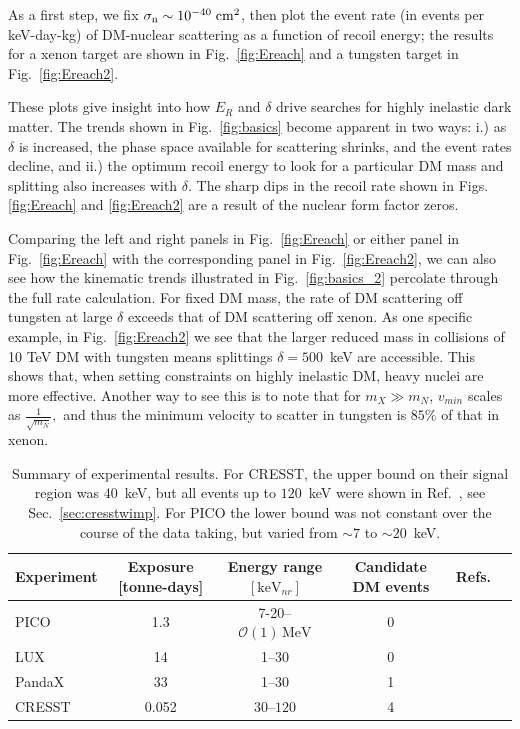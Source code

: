 \documentclass[11pt]{article}
\begin{document}
As a first step, we fix $\sigma_{\rm n} \sim 10^{-40} \; {\rm cm}^2$, then plot the event rate (in events per keV-day-kg) of DM-nuclear scattering as a function of recoil energy; the results for a xenon target are shown in Fig.~\ref{fig:Ereach} and a tungsten target in Fig.~\ref{fig:Ereach2}.

These plots give insight into how $E_R$ and $\delta$ drive searches for highly inelastic dark matter. The trends shown in Fig.~\ref{fig:basics} become apparent in two ways: i.) as $\delta$ is increased, the phase space available for scattering shrinks, and the event rates decline, and ii.) the optimum recoil energy to look for a particular DM mass and splitting also increases with $\delta$. The sharp dips in the recoil rate shown in Figs. \ref{fig:Ereach} and \ref{fig:Ereach2} are a result of the nuclear form factor zeros.

Comparing the left and right panels in Fig.~\ref{fig:Ereach} or either panel in Fig.~\ref{fig:Ereach}  with the corresponding panel in Fig.~\ref{fig:Ereach2}, we can also see how the kinematic trends illustrated in Fig.~\ref{fig:basics_2} percolate through the full rate calculation.  For fixed DM mass, the rate of DM scattering off tungsten at large $\delta$ exceeds that of DM scattering off xenon.  As one specific example, in Fig.~\ref{fig:Ereach2} we see that the larger reduced mass in collisions of 10 TeV DM with tungsten means splittings $\delta = 500$~keV are accessible. This shows that, when setting constraints on highly inelastic DM, heavy nuclei are more effective.  Another way to see this is to note that for $m_X \gg m_N$, $v_{min}$ scales as $\frac{1} {\sqrt{m_N}},$ and thus the minimum velocity to scatter in tungsten is $85\%$ of that in xenon.

\begin{table}[t]
   \centering
   \begin{tabular}{@{} lccccc @{}} %
      \toprule 
        Experiment   & Exposure [tonne-days] & Energy range $[\mathrm{keV}_{nr}]$
& Candidate DM events & Refs.\\
      \midrule
    PICO            & 1.3       & 7-20--$\mathcal{O}(1)\,\mathrm{MeV}$ &0           & \cite{Amole:2015pla}\\
    LUX              & 14        & 1--30                            & 0           & \cite{Akerib:2015rjg} \\
    PandaX        & 33         & 1--30		             & 1           &\cite{Tan:2016zwf}\\
    CRESST      & 0.052   & $30$--$120$                   &          4  & \cite{Angloher:2015ewa} \\
      \bottomrule
   \end{tabular}
   \caption{Summary of experimental results.  For CRESST, the
upper bound on their signal region was $40$~keV, but all events up to 
$120$~keV were shown in Ref.~\cite{Angloher:2015ewa}, see
Sec.~\ref{sec:cresstwimp}. For PICO the lower bound was not
constant over the course of the data taking, but varied from 
$\sim 7$ to $\sim 20$~keV.}
   \label{tab:experimentalnumbers}
\end{table}
\end{document}

